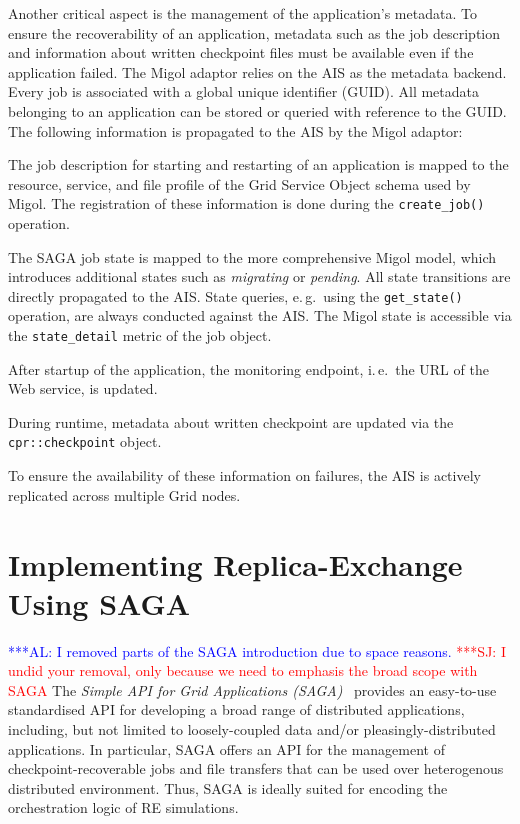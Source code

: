 \documentclass{rspublic}
\newcommand{\alnote}[1]{ {\textcolor{blue} { ***AL: #1 }}}
\newcommand{\jhanote}[1]{ {\textcolor{red} { ***SJ: #1 }}}
\newcommand{\alnote}[1]{}
\newcommand{\jhanote}[1]{}
\begin{document}
Another critical aspect is the management of the application's
metadata. To ensure the recoverability of an application, metadata
such as the job description and information about written checkpoint
files must be available even if the application failed. The Migol
adaptor relies on the AIS as the metadata backend. Every job is
associated with a global unique identifier (GUID).
All metadata belonging to an application can be stored or queried with
reference to the GUID.  The following information is propagated to the
AIS by the Migol adaptor:

\begin{compactitem}
\item The job description for starting and restarting of an
  application is mapped to the resource, service, and file profile of
  the Grid Service Object schema used by Migol. The registration of
  these information is done during the \texttt{create\_job()}
  operation.
\item The SAGA job state is mapped to the more comprehensive Migol
  model, which introduces additional states such as \emph{migrating}
  or \emph{pending}. All state transitions are directly propagated to
  the AIS. State queries, e.\,g.\ using the \texttt{get\_state()}
  operation, are always conducted against the AIS. The Migol state is
  accessible via the \texttt{state\_detail} metric of the job object.
\item After startup of the application, the monitoring endpoint,
  i.\,e.\ the URL of the Web service, is updated.
\item During runtime, metadata about written checkpoint are 
  updated via the \texttt{cpr::checkpoint} object.
\end{compactitem}   
To ensure the availability of these information on failures,
the AIS is actively replicated across multiple Grid nodes.


\section{Implementing Replica-Exchange Using SAGA}

\alnote{I removed parts of the SAGA introduction due to space
  reasons.}  \jhanote{I undid your removal, only because we need to
  emphasis the broad scope with SAGA} The \emph{Simple API for Grid
  Applications (SAGA)}~\cite{saga_gfd90} provides an easy-to-use
standardised API for developing a broad range of distributed
applications, including, but not limited to loosely-coupled data
and/or pleasingly-distributed
applications.  %
In particular, SAGA offers an API for the management of
checkpoint-recoverable jobs and file transfers that can be used over
heterogenous distributed environment. Thus, SAGA is ideally suited for
encoding the orchestration logic of RE simulations.
\end{document}
